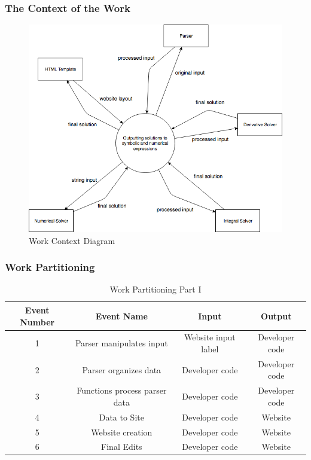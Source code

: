 \documentclass[11pt, oneside]{article}
\begin{document}
\subsubsection{The Context of the Work}
\begin{figure}[H] %
   \centering
   \includegraphics[width=6in]{WorkContextDiagram.png}
   \caption{Work Context Diagram}
   \label{fig:example}
\end{figure}


\subsubsection{Work Partitioning}
\begin{table}[H]
\caption{Work Partitioning Part I}
\begin{center}
\begin{tabular}{|c|c|c|c|}
\hline
Event Number & Event Name & Input & Output\\
\hline
1 & Parser manipulates input & Website input label & Developer code\\
\hline    
2 & Parser organizes data  & Developer code & Developer code\\
\hline    
3 & Functions process parser data & Developer code & Developer code\\
\hline
4 & Data to Site & Developer code & Website\\
\hline    
5 & Website creation & Developer code & Website\\
\hline    
6 & Final Edits & Developer code & Website\\
\hline
\end{tabular}
\end{center}
\label{default}
\end{table}%
 
\end{document}
